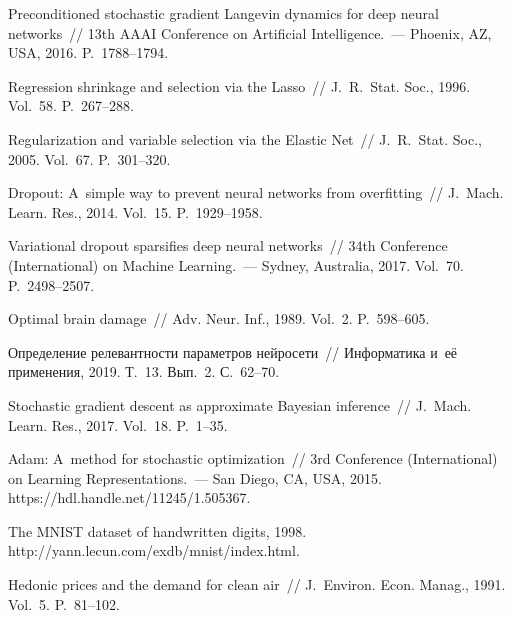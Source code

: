 \begin{multicols}{2}
{{\begin{thebibliography}{99}
     Preconditioned stochastic 
gradient Langevin dynamics for deep neural networks~// 13th AAAI 
Conference on Artificial Intelligence.~--- Phoenix, AZ, USA, 2016. P.~1788--1794.
    
     Regression shrinkage and selection via the 
Lasso~// J.~R.~Stat. Soc., 1996. Vol.~58. P.~267--288.
    
     Regularization and variable selection via 
the Elastic Net~// J.~R.~Stat. Soc., 2005. Vol.~67. P.~301--320.
    
     Dropout: A~simple way to prevent neural networks from 
overfitting~// J.~Mach. Learn. Res., 2014. Vol.~15. P.~1929--1958.
    
     Variational dropout 
sparsifies deep neural networks~// 34th  Conference (International) on 
Machine Learning.~--- Sydney, Australia, 2017. Vol.~70. P.~2498--2507.
    
     Optimal brain damage~// Adv. 
Neur. Inf., 1989. Vol.~2. P.~598--605.
    
     Определение 
релевантности параметров нейросети~// Информатика и~её применения, 2019. 
Т.~13. Вып.~2. С.~62--70.

     Stochastic gradient descent as 
approximate Bayesian inference~// J.~Mach. Learn. Res., 2017. 
Vol.~18. P.~1--35.
    
     Adam: A~method for stochastic optimization~// 
3rd Conference (International) on Learning Representations.~--- San 
Diego, CA, USA, 2015. {\sf https://hdl.handle.net/11245/1.505367}.



     The MNIST dataset of 
handwritten digits, 1998. {\sf 
http://yann.lecun.com/\linebreak exdb/mnist/index.html}.

     Hedonic prices and the demand for 
clean air~// J.~Environ. Econ. Manag., 1991. Vol.~5. P.~81--102.


\end{thebibliography}

 }
 }

\end{multicols}

